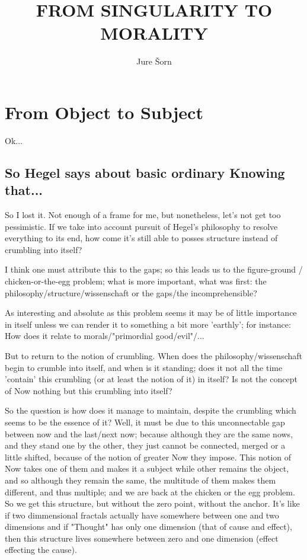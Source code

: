 \documentclass[10pt]{book}
\begin{document}
\title{FROM SINGULARITY TO MORALITY}
\author{Jure \v Sorn}
\maketitle

\tableofcontents

\chapter {From Object to Subject}

Ok...

\section{So Hegel says about basic ordinary Knowing that...}

So I lost it. Not enough of a frame for me, but nonetheless, let's not get too pessimistic. If we take into account pursuit of Hegel's philosophy to resolve everything to its end, how come it's still able to posses structure instead of crumbling into itself?

I think one must attribute this to the gaps; so this leads us to the figure-ground / chicken-or-the-egg problem; what is more important, what was first: the philosophy/structure/wissenschaft or the gaps/the incomprehensible?

As interesting and absolute as this problem seems it may be of little importance in itself unless we can render it to something a bit more 'earthly'; for instance: How does it relate to morals/"primordial good/evil"/...

But to return to the notion of crumbling. When does the philosophy/wissenschaft begin to crumble into itself, and when is it standing; does it not all the time 'contain' this crumbling (or at least the notion of it) in itself? Is not the concept of Now nothing but this crumbling into itself?

So the question is how does it manage to maintain, despite the crumbling which seems to be the essence of it? Well, it must be due to this unconnectable gap between now and the last/next now; because although they are the same nows, and they stand one by the other, they just cannot be connected, merged or a little shifted, because of the notion of greater Now they impose. This notion of Now takes one of them and makes it a subject while other remains the object, and so although they remain the same, the multitude of them makes them different, and thus multiple; and we are back at the chicken or the egg problem. So we get this structure, but without the zero point, without the anchor. It's like if two dimmensional fractals actually have somewhere between one and two dimensions and if "Thought" has only one dimension (that of cause and effect), then this structure lives somewhere between zero and one dimension (effect effecting the cause). 
\end{document}
